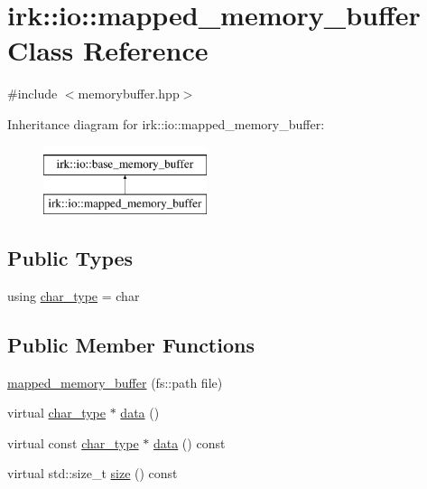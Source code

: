 \hypertarget{classirk_1_1io_1_1mapped__memory__buffer}{}\section{irk\+:\+:io\+:\+:mapped\+\_\+memory\+\_\+buffer Class Reference}
\label{classirk_1_1io_1_1mapped__memory__buffer}


{\ttfamily \#include $<$memorybuffer.\+hpp$>$}

Inheritance diagram for irk\+:\+:io\+:\+:mapped\+\_\+memory\+\_\+buffer\+:\begin{figure}[H]
\begin{center}
\leavevmode
\includegraphics[height=2.000000cm]{classirk_1_1io_1_1mapped__memory__buffer}
\end{center}
\end{figure}
\subsection*{Public Types}
\begin{DoxyCompactItemize}
\item 
using \mbox{\hyperlink{classirk_1_1io_1_1mapped__memory__buffer_a8335df78a8e028b6ee8fb4011e2abfc7}{char\+\_\+type}} = char
\end{DoxyCompactItemize}
\subsection*{Public Member Functions}
\begin{DoxyCompactItemize}
\item 
\mbox{\hyperlink{classirk_1_1io_1_1mapped__memory__buffer_a4484625f0aff60adefca35d8933bc9ff}{mapped\+\_\+memory\+\_\+buffer}} (fs\+::path file)
\item 
virtual \mbox{\hyperlink{classirk_1_1io_1_1base__memory__buffer_a1b539180df4274dd4ad0402a0ac821ec}{char\+\_\+type}} $\ast$ \mbox{\hyperlink{classirk_1_1io_1_1mapped__memory__buffer_a2b731cf50320c20fb271bdd5c6f384c4}{data}} ()
\item 
virtual const \mbox{\hyperlink{classirk_1_1io_1_1base__memory__buffer_a1b539180df4274dd4ad0402a0ac821ec}{char\+\_\+type}} $\ast$ \mbox{\hyperlink{classirk_1_1io_1_1mapped__memory__buffer_ab4bbb25488358a3d527d45d16a845fb6}{data}} () const
\item 
virtual std\+::size\+\_\+t \mbox{\hyperlink{classirk_1_1io_1_1mapped__memory__buffer_ae64bb8d5018d83bd9feb605704bb0c82}{size}} () const
\end{DoxyCompactItemize}



